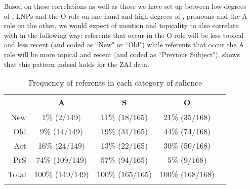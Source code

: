 Based on these correlations as well as those we have set up between low degrees of , LNPs and the O role on one hand and high degrees of , pronouns and the A role on the other, we would expect  of mention and topicality to also correlate with  in the following way: referents that occur in the O role will be less topical and less recent (and coded as ``New" or ``Old") while referents that occur the A role will be more topical and recent (and coded as ``Previous Subject").  shows that this pattern indeed holds for the ZAI data.
\begin{table}

\caption{{Frequency of referents in each category of salience}}
\begin{tabular}{ r  c  c  c  c }
\lsptoprule
  & \textsc{A} & \textsc{S} & \textsc{O} \\

\midrule 
 New & 1{\%} (2/149) & 11{\%} (18/165) & 21{\%} (35/168)   \\

 Old & 9{\%} (14/149) & 19{\%} (31/165) & 44{\%} (74/168)  \\

  Act & 16{\%} (24/149) & 13{\%} (22/165) & 30{\%} (50/168)  \\

 PrS & 74{\%} (109/149) & 57{\%} (94/165) & 5{\%} (9/168) \\

\midrule
 Total& 100{\%} (149/149)  & 100{\%} (165/165)  &  100{\%} (168/168)\\

\lspbottomrule
\end{tabular}\\
\label{totalsalience1}

\end{table}



